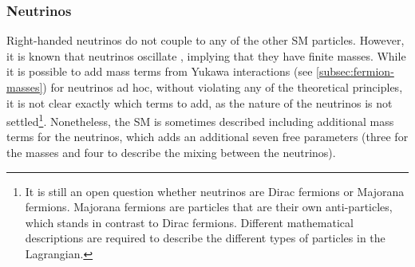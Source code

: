 \subsubsection{Neutrinos}
Right-handed neutrinos do not couple to any of the other SM particles.
However, it is known that neutrinos oscillate \cite{Gonzalez_Garcia_2008}, implying that they have finite masses.
While it is possible to add mass terms from Yukawa interactions (see \cref{subsec:fermion-masses}) for neutrinos ad hoc, without violating any of the theoretical principles, it is not clear exactly which terms to add, as the nature of the neutrinos is not settled\footnote{It is still an open question whether neutrinos are Dirac fermions or Majorana fermions. Majorana fermions are particles that are their own anti-particles, which stands in contrast to Dirac fermions. Different mathematical descriptions are required to describe the different types of particles in the Lagrangian.}. 
Nonetheless, the SM is sometimes described including additional mass terms for the neutrinos, which adds an additional seven free parameters (three for the masses and four to describe the mixing between the neutrinos).



